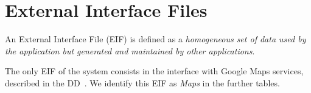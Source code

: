 \section{External Interface Files}
An External Interface File (EIF) is defined as a \emph{homogeneous set of data used by the application but generated and maintained by other applications}.

The only EIF of the system consists in the interface with Google Maps services, described in the DD~\cite[p.~33]{mytaxi-dd}.
We identify this EIF as \emph{Maps} in the further tables.
